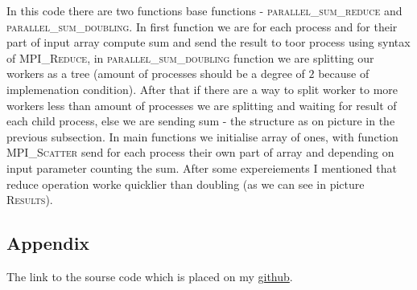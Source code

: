 \documentclass[%
12pt, %
final, %
oneside, %
onecolumn, %
centertags]{article} %
\theoremstyle{plain}
\theoremstyle{definition}
\theoremstyle{remark}
\begin{document}
In this code there are two functions base functions - \textsc{parallel\_sum\_reduce} and \textsc{parallel\_sum\_doubling}. In first function we are for each process and for their part of input array compute sum and send the result to toor process using syntax of \textsc{MPI\_Reduce}, in \textsc{parallel\_sum\_doubling} function we are splitting our workers as a tree (amount of processes should be a degree of $2$ because of implemenation condition). After that if there are a way to split worker to more workers less than amount of processes we are splitting and waiting for result of each child process, else we are sending sum - the structure as on picture in the previous subsection. In main functions we initialise array of ones, with function \textsc{MPI\_Scatter} send for each process their own part of array and depending on input parameter counting the sum. After some expereiements I mentioned that reduce operation worke quicklier than doubling (as we can see in picture \textsc{Results}).



\subsection{Appendix}

The link to the sourse code which is placed on my \href{https://github.com/aptmess/parallel_algorithms}{github}.
\end{document}

